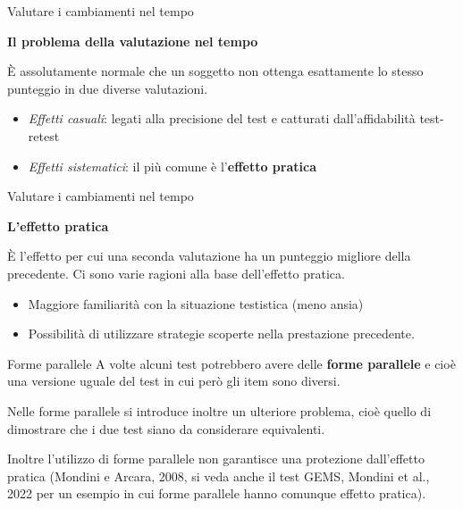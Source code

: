\documentclass[
  ignorenonframetext,
  aspectratio=169,
]{beamer}
\begin{document}
\begin{frame}{Valutare i cambiamenti nel tempo}
\label{valutare-i-cambiamenti-nel-tempo-1}
\begin{center}
  \textbf{Il problema della valutazione nel tempo}
\end{center}
\vspace{2em}

È assolutamente normale che un soggetto non ottenga esattamente lo
stesso punteggio in due diverse valutazioni.

\begin{itemize}
\item
  \emph{Effetti casuali}: legati alla precisione del test e catturati
  dall'affidabilità test-retest
\item
  \emph{Effetti sistematici}: il più comune è l'\textbf{effetto pratica}
\end{itemize}
\end{frame}

\begin{frame}{Valutare i cambiamenti nel tempo}
\label{valutare-i-cambiamenti-nel-tempo-2}
\begin{center}
  \textbf{L'effetto pratica}
\end{center}
\vspace{1em}

È l'effetto per cui una seconda valutazione ha un punteggio migliore
della precedente. Ci sono varie ragioni alla base dell'effetto pratica.

\begin{itemize}
\item
  Maggiore familiarità con la situazione testistica (meno ansia)
\item
  Possibilità di utilizzare strategie scoperte nella prestazione
  precedente.
\end{itemize}
\end{frame}

\begin{frame}{Forme parallele}
\label{forme-parallele}
A volte alcuni test potrebbero avere delle \textbf{forme parallele} e
cioè una versione uguale del test in cui però gli item sono diversi.

Nelle forme parallele si introduce inoltre un ulteriore problema, cioè
quello di dimostrare che i due test siano da considerare equivalenti.

Inoltre l'utilizzo di forme parallele non garantisce una protezione
dall'effetto pratica (Mondini e Arcara, 2008, si veda anche il test
GEMS, Mondini et al., 2022 per un esempio in cui forme parallele hanno
comunque effetto pratica).
\end{frame}
\end{document}
